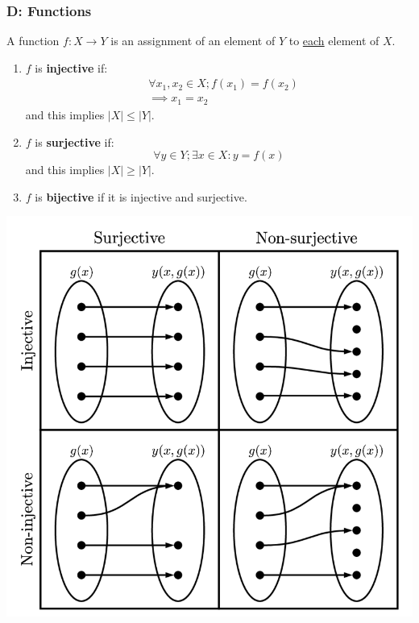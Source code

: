 \documentclass{article}
\begin{document}
\begin{multicols*}{3}
\noindent

\subsubsection*{D: Functions}
A function $f:X\rightarrow Y$ is an assignment
of an element of $Y$ to \underline{each} element of $X$.
\begin{enumerate}
    \item $f$ is \textbf{injective} if:
    \begin{align*}
        &\forall x_1,x_2\in X;
        f(x_1)=f(x_2) \\ &\implies x_1=x_2
    \end{align*}
    and this implies $|X|\leq|Y|$.

    \item $f$ is \textbf{surjective} if:
    $$\forall y\in Y;\exists x\in X: y=f(x)$$
    and this implies $|X|\geq|Y|$.

    \item $f$ is \textbf{bijective}
    if it is injective and surjective.
\end{enumerate}
\begin{center}
    \includegraphics[scale=0.2]{f00.png}
\end{center}


\end{multicols*}
\end{document}
